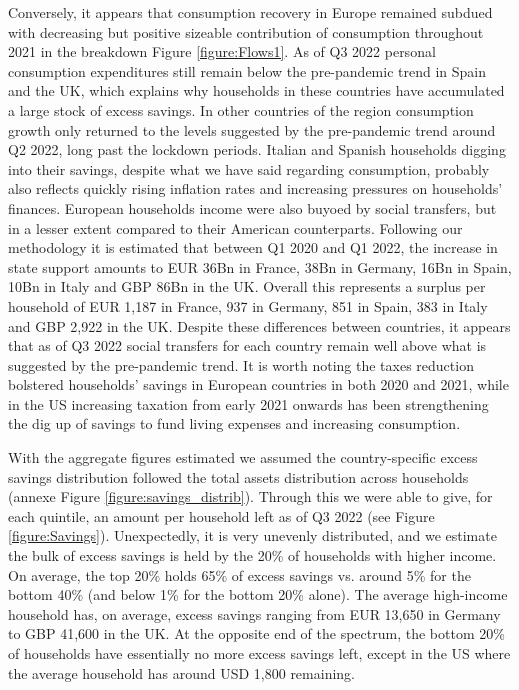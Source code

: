 Conversely, it appears that consumption recovery in Europe remained subdued with decreasing but positive sizeable contribution of consumption throughout 2021 in the breakdown Figure \ref{figure:Flows1}.
As of Q3 2022 personal consumption expenditures still remain below the pre-pandemic trend in Spain and the UK, which explains why households in these countries have accumulated a large stock of excess savings. 
In other countries of the region consumption growth only returned to the levels suggested by the pre-pandemic trend around Q2 2022, long past the lockdown periods. 
Italian and Spanish households digging into their savings, despite what we have said regarding consumption, probably also reflects quickly rising inflation rates and increasing pressures on households’ finances. 
European households income were also buyoed by social transfers, but in a lesser extent compared to their American counterparts. 
Following our methodology it is estimated that between Q1 2020 and Q1 2022, the increase in state support amounts to EUR 36Bn in France, 38Bn in Germany, 16Bn in Spain, 10Bn in Italy and GBP 86Bn in the UK. 
Overall this represents a surplus per household of EUR 1,187 in France, 937 in Germany, 851 in Spain, 383 in Italy and GBP 2,922 in the UK.
Despite these differences between countries, it appears that as of Q3 2022 social transfers for each country remain well above what is suggested by the pre-pandemic trend.
It is worth noting the taxes reduction bolstered households’ savings in European countries in both 2020 and 2021, while in the US increasing taxation from early 2021 onwards has been strengthening the dig up of savings to fund living expenses and increasing consumption.

With the aggregate figures estimated we assumed the country-specific excess savings distribution followed the total assets distribution across households (annexe Figure \ref{figure:savings_distrib}). 
Through this we were able to give, for each quintile, an amount per household left as of Q3 2022 (see Figure \ref{figure:Savings}). 
Unexpectedly, it is very unevenly distributed, and we estimate the bulk of excess savings is held by the 20\% of households with higher income. 
On average, the top 20\% holds 65\% of excess savings vs. around 5\% for the bottom 40\% (and below 1\% for the bottom 20\% alone). 
The average high-income household has, on average, excess savings ranging from EUR 13,650 in Germany to GBP 41,600 in the UK. 
At the opposite end of the spectrum, the bottom 20\% of households have essentially no more excess savings left, except in the US where the average household has around USD 1,800 remaining. 

